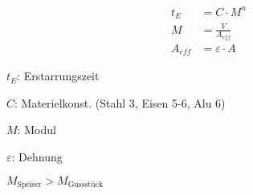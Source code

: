 \begin{tiny}
\begin{minipage}{0.5\linewidth}
    \[
    \boxed{        
        \begin{aligned}
            t_E &= C \cdot M^n\\
            M &= \frac{V}{A_{eff}}\\
            A_{eff} &= \varepsilon \cdot A
        \end{aligned}
    }
    \]
\end{minipage}
\begin{minipage}{0.5\linewidth}
        \item $t_E$: Erstarrungszeit
        \item $C$: Materielkonst. (Stahl 3, Eisen 5-6, Alu 6)
        \item $M$: Modul
        \item $\varepsilon $: Dehnung
\end{minipage}
\vspace{1mm}
\end{tiny}
\begin{center}
   $M_{\text{Speiser}} > M_{\text{Gussstück}}$ 
\end{center}

